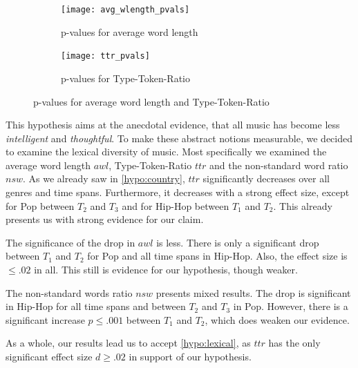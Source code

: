 \documentclass[11pt,a4paper]{article}
\begin{document}
\begin{figure}[t!]
	\centering
	\begin{subfigure}[t]{0.49\textwidth}
	\centering
	\texttt{[image: avg\_wlength\_pvals]}
	\label{fig:pvals:wlength}
	\caption{p-values for average word length}
	\end{subfigure}
	\begin{subfigure}[t]{0.49\textwidth}
	\texttt{[image: ttr\_pvals]}
	\label{fig:pvals:ttr}
	\caption{p-values for Type-Token-Ratio}
	\centering
	\end{subfigure}
	\label{fig:pvals:wlength-ttr}
	\caption{p-values for average word length and Type-Token-Ratio}
\end{figure}

This hypothesis aims at the anecdotal evidence, that all music has become less \emph{intelligent} and \emph{thoughtful}. To make these abstract notions measurable, we decided to examine the lexical diversity of music. Most specifically we examined the average word length $awl$, Type-Token-Ratio $ttr$ and the non-standard word ratio $nsw$. As we already saw in \ref{hypo:country}, $ttr$ significantly decreases over all genres and time spans. Furthermore, it decreases with a strong effect size, except for Pop between $T_2$ and $T_3$ and for Hip-Hop between $T_1$ and $T_2$. This already presents us with strong evidence for our claim.

The significance of the drop in $awl$ is less. There is only a significant drop between $T_1$ and $T_2$ for Pop and all time spans in Hip-Hop. Also, the effect size is $\leq .02$ in all. This still is evidence for our hypothesis, though weaker.

The non-standard words ratio $nsw$ presents mixed results. The drop is significant in Hip-Hop for all time spans and between $T_2$ and $T_3$ in Pop. However, there is a significant increase $p \leq .001$ between $T_1$ and $T_2$, which does weaken our evidence.

As a whole, our results lead us to accept \ref{hypo:lexical}, as $ttr$ has the only significant effect size $d \geq .02$ in support of our hypothesis.
\end{document}
